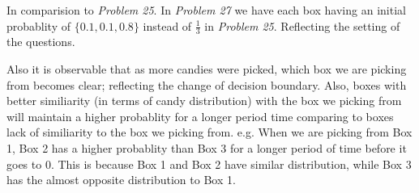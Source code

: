 \documentclass[12pt]{article}
\begin{document}
In comparision to \textit{Problem 25}. In \textit{Problem 27} we have each box having an initial probablity of $\{0.1, 0.1, 0.8\}$ instead of $\frac{1}{3}$ in \textit{Problem 25}. Reflecting the setting of the questions.

Also it is observable that as more candies were picked, which box we are picking from becomes clear; reflecting the change of decision boundary. Also, boxes with better similiarity (in terms of candy distribution) with the box we picking from will maintain a higher probablity for a longer period time comparing to boxes lack of similiarity to the box we picking from. e.g. When we are picking from Box 1, Box 2 has a higher probablity than Box 3 for a longer period of time before it goes to 0. This is because Box 1 and Box 2 have similar distribution, while Box 3 has the almost opposite distribution to Box 1.


% 
% 
\end{document}
